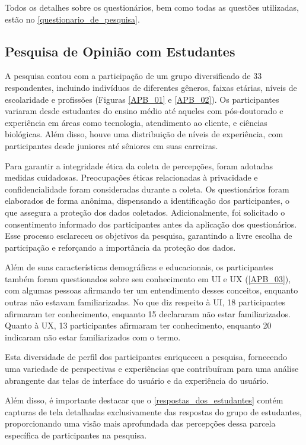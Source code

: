 Todos os detalhes sobre os questionários, bem como todas as questões utilizadas, estão no \autoref{questionario_de_pesquisa}.

\subsection{Pesquisa de Opinião com Estudantes}
\label{Pesquisa_de_Opinião_com_Estudantes}

A pesquisa contou com a participação de um grupo diversificado de 33 respondentes, incluindo indivíduos de diferentes gêneros, faixas etárias, níveis de escolaridade e profissões (Figuras \ref{APB_01} e \ref{APB_02}). Os participantes variaram desde estudantes do ensino médio até aqueles com pós-doutorado e experiência em áreas como tecnologia, atendimento ao cliente, e ciências biológicas. Além disso, houve uma distribuição de níveis de experiência, com participantes desde juniores até sêniores em suas carreiras.

Para garantir a integridade ética da coleta de percepções, foram adotadas medidas cuidadosas. Preocupações éticas relacionadas à privacidade e confidencialidade foram consideradas durante a coleta. Os questionários foram elaborados de forma anônima, dispensando a identificação dos participantes, o que assegura a proteção dos dados coletados. Adicionalmente, foi solicitado o consentimento informado dos participantes antes da aplicação dos questionários. Esse processo esclareceu os objetivos da pesquisa, garantindo a livre escolha de participação e reforçando a importância da proteção dos dados.

Além de suas características demográficas e educacionais, os participantes também foram questionados sobre seu conhecimento em \ac{UI} e \ac{UX} (\autoref{APB_03}), com algumas pessoas afirmando ter um entendimento desses conceitos, enquanto outras não estavam familiarizadas. No que diz respeito à \ac{UI}, 18 participantes afirmaram ter conhecimento, enquanto 15 declararam não estar familiarizados. Quanto à \ac{UX}, 13 participantes afirmaram ter conhecimento, enquanto 20 indicaram não estar familiarizados com o termo.

Esta diversidade de perfil dos participantes enriqueceu a pesquisa, fornecendo uma variedade de perspectivas e experiências que contribuíram para uma análise abrangente das telas de interface do usuário e da experiência do usuário. 

Além disso, é importante destacar que o \autoref{respostas_dos_estudantes} contém capturas de tela detalhadas exclusivamente das respostas do grupo de estudantes, proporcionando uma visão mais aprofundada das percepções dessa parcela específica de participantes na pesquisa.

